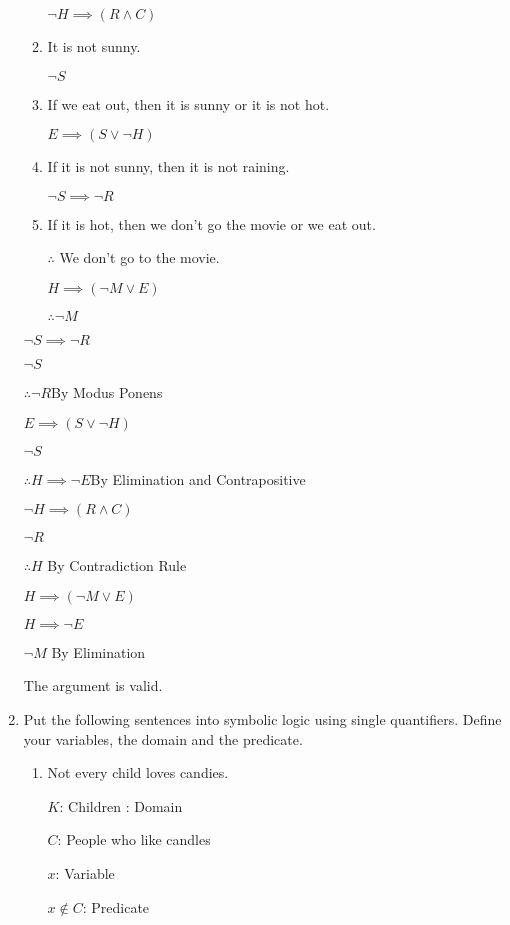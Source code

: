 \documentclass[12pt,letterpaper,titlepage]{article}
\begin{document}
\begin{raggedright}
\begin{enumerate}
\begin{enumerate}[label=(\alph*)]
$\neg H \implies (R \land C)$

\item It is not sunny.

$\neg S$

\item If we eat out, then it is sunny or it is not hot.

$E \implies (S \lor \neg H)$

\item If it is not sunny, then it is not raining.

$\neg S \implies \neg R$

\item If it is hot, then we don’t go the movie or we eat out. 

$\therefore$ We don’t go to the movie.

$H \implies (\neg M \lor E)$

$\therefore \neg M$

\end{enumerate}

$\neg S \implies \neg R$ 

$\neg S$

$\therefore \neg R$\qquad By Modus Ponens

$E \implies (S \lor \neg H)$

$\neg S$

$\therefore H \implies \neg E$\qquad By Elimination and Contrapositive

$\neg H \implies (R \land C)$

$\neg R$

$\therefore H$ \qquad By Contradiction Rule 

$H \implies (\neg M \lor E)$

$H \implies \neg E$

$\neg M$ \qquad By Elimination

The argument is valid.

\pagebreak

\item Put the following sentences into symbolic logic using single quantifiers. Define your variables, the domain and the predicate.
\begin{enumerate}[label=(\alph*)]
\item Not every child loves candies.

$K$: Children : Domain

$C$: People who like candles

$x$: Variable

$x \notin C$: Predicate


\end{enumerate}
\end{enumerate}
\end{raggedright}
\end{document}
